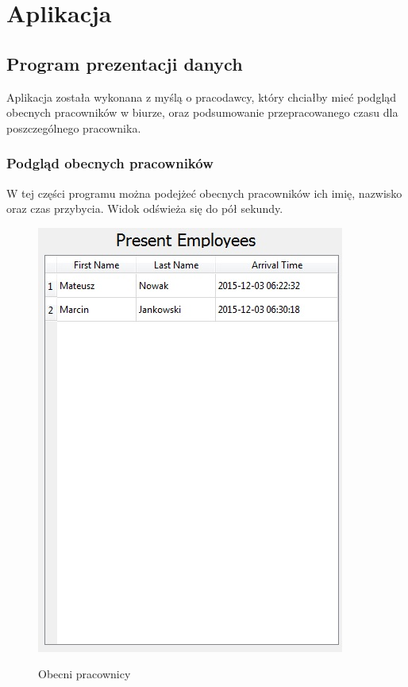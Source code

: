 \chapter{Aplikacja}
\section{Program prezentacji danych}
Aplikacja została wykonana z myślą o pracodawcy, który chciałby mieć podgląd obecnych pracowników w biurze, oraz podsumowanie przepracowanego czasu dla poszczególnego pracownika.
\subsection{Podgląd obecnych pracowników}
W tej części programu można podejżeć obecnych pracowników ich imię, nazwisko oraz czas przybycia.
Widok odświeża się do pół sekundy.
\begin{figure}[h!]
	\centering
	\includegraphics[]{img/present_employees.jpg}
	\label{fig:present_employees}
	\caption[Obecni pracownicy]{Obecni pracownicy}
\end{figure}
